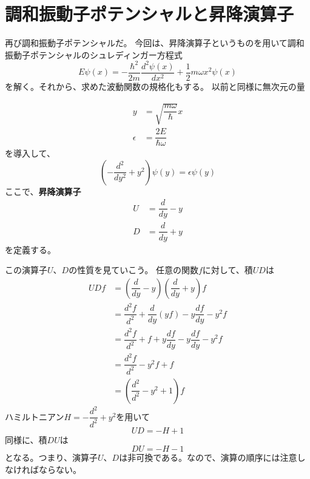 
\section{調和振動子ポテンシャルと昇降演算子}
再び調和振動子ポテンシャルだ。
今回は、昇降演算子というものを用いて調和振動子ポテンシャルのシュレディンガー方程式
\begin{equation}
	\label{harmony_schrodinger_eq}
	E\psi(x) = - \dfrac{\hbar^2}{2m} \dfrac{d^2 \psi(x)}{d x^2} + \dfrac{1}{2}m\omega x^2\psi(x)
\end{equation}
を解く。それから、求めた波動関数の規格化もする。
以前と同様に無次元の量

\begin{align}
		\label{y}
		y &= \sqrt{\dfrac{m\omega}{\hbar}}x \\
		\label{eps}
		\epsilon &= \dfrac{2E}{\hbar\omega}
\end{align}
を導入して、
\begin{equation}
	\label{harmony_DE}
\left( -\dfrac{d^2}{d y^2} + y^2 \right) \psi(y) = \epsilon\psi(y)
\end{equation}
ここで、{\bf 昇降演算子}
\begin{align}
	\label{U}
	U &= \dfrac{d}{dy} - y \\
	\label{D}
	D &= \dfrac{d}{dy} + y
\end{align}
を定義する。

この演算子$U、D$の性質を見ていこう。
任意の関数$f$に対して、積$UD$は
\begin{align}
	UDf &= \left( \dfrac{d}{dy} - y \right)\left( \dfrac{d}{dy} + y \right)f \\
			&= \dfrac{d^2f}{d^2} + \dfrac{d}{dy}(yf) - y\dfrac{df}{dy} - y^2 f \\
			&= \dfrac{d^2f}{d^2} + f +  y\dfrac{df}{dy} - y\dfrac{df}{dy} - y^2 f \\
			&= \dfrac{d^2f}{d^2} -y^2 f + f \\
			&= \left( \dfrac{d^2}{d^2} -y^2 + 1\right)f
\end{align}
ハミルトニアン$H = -\dfrac{d^2}{d^2} + y^2$を用いて
\begin{equation}
	\label{UD}
	UD = -H + 1
\end{equation}
同様に、積$DU$は
\begin{equation}
	\label{DU}
	DU = -H - 1
\end{equation}
となる。つまり、演算子$U、D$は非可換である。なので、演算の順序には注意しなければならない。

